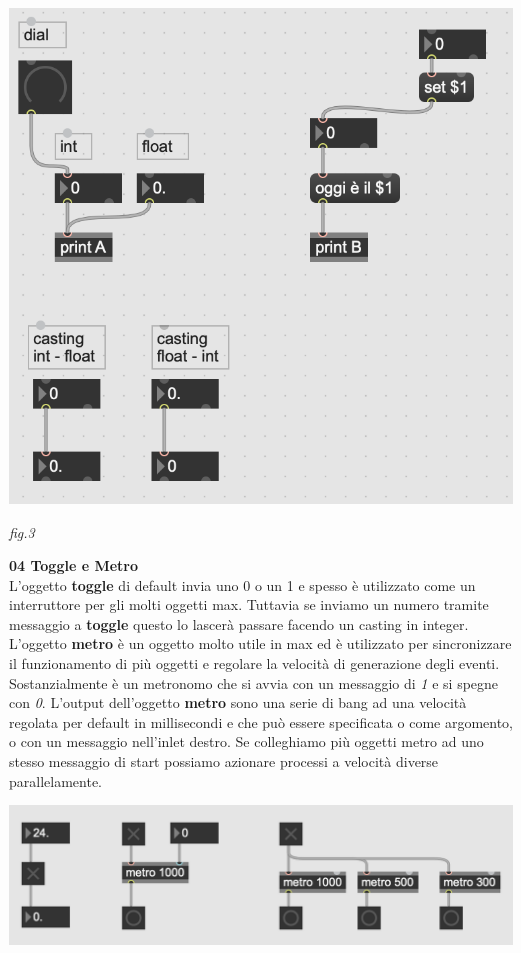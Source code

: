 \documentclass[11pt]{article}
\begin{document}
\begin{multicols*}{2}
\begin{center}
\includegraphics[scale=0.3]{images/03_number.png}

{\scriptsize \emph{fig.3 }}
\end{center}

\textbf{\textsf {04 Toggle e Metro}}\\

\noindent L’oggetto \textbf{toggle} di default invia uno 0 o un 1 e spesso è utilizzato come un interruttore per gli molti oggetti max. Tuttavia se inviamo un numero tramite messaggio a \textbf{toggle} questo lo lascerà passare facendo un casting in integer.
L’oggetto \textbf{metro} è un oggetto molto utile in max ed è utilizzato per sincronizzare il funzionamento di più oggetti e regolare la velocità di generazione degli eventi. Sostanzialmente è un metronomo che si avvia con un messaggio di \textit{1} e si spegne con \textit{0}. L’output dell’oggetto \textbf{metro} sono una serie di bang ad una velocità regolata per default in millisecondi e che può essere specificata o come argomento, o con un messaggio nell’inlet destro. Se colleghiamo più oggetti metro ad uno stesso messaggio di start possiamo azionare processi a velocità diverse parallelamente.

\begin{center}
\includegraphics[scale=0.3]{images/04_toggle e metro.png}


\end{center}
\end{multicols*}
\end{document}
